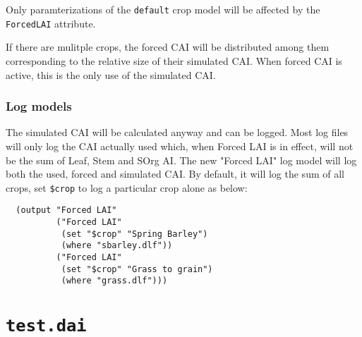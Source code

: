 \documentclass[a4paper,11pt]{article}
\begin{document}
Only paramterizations of the \texttt{default} crop model will be
affected by the \texttt{ForcedLAI} attribute.

If there are mulitple crops, the forced CAI will be distributed among
them corresponding to the relative size of their simulated CAI\@.  When
forced CAI is active, this is the only use of the simulated CAI\@.  

\subsubsection{Log models}

The simulated CAI will be calculated anyway and can be logged.  Most
log files will only log the CAI actually used which, when Forced LAI
is in effect, will not be the sum of Leaf, Stem and SOrg AI\@.  The new
"Forced LAI" log model will log both the used, forced and simulated
CAI\@.  By default, it will log the sum of all crops, set
\verb|$crop|%
to log a particular crop alone as below:

\begin{verbatim}
  (output "Forced LAI"
          ("Forced LAI"
           (set "$crop" "Spring Barley")
           (where "sbarley.dlf"))
          ("Forced LAI"
           (set "$crop" "Grass to grain")
           (where "grass.dlf")))
\end{verbatim}

\section{\texttt{test.dai}}
\label{app:test}
\end{document}
